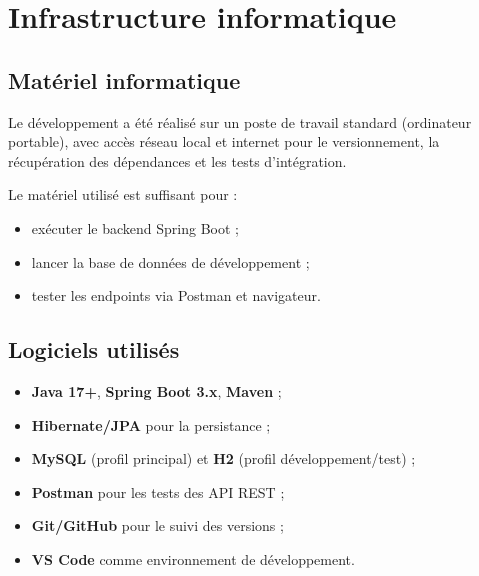 \chapter{Infrastructure informatique}

\section{Matériel informatique}
Le développement a été réalisé sur un poste de travail standard (ordinateur portable), avec accès réseau local et internet pour le versionnement, la récupération des dépendances et les tests d'intégration.

Le matériel utilisé est suffisant pour :
\begin{itemize}
  \item exécuter le backend Spring Boot ;
  \item lancer la base de données de développement ;
  \item tester les endpoints via Postman et navigateur.
\end{itemize}

\section{Logiciels utilisés}
\begin{itemize}
  \item \textbf{Java 17+}, \textbf{Spring Boot 3.x}, \textbf{Maven} ;
  \item \textbf{Hibernate/JPA} pour la persistance ;
  \item \textbf{MySQL} (profil principal) et \textbf{H2} (profil développement/test) ;
  \item \textbf{Postman} pour les tests des API REST ;
  \item \textbf{Git/GitHub} pour le suivi des versions ;
  \item \textbf{VS Code} comme environnement de développement.
\end{itemize}
